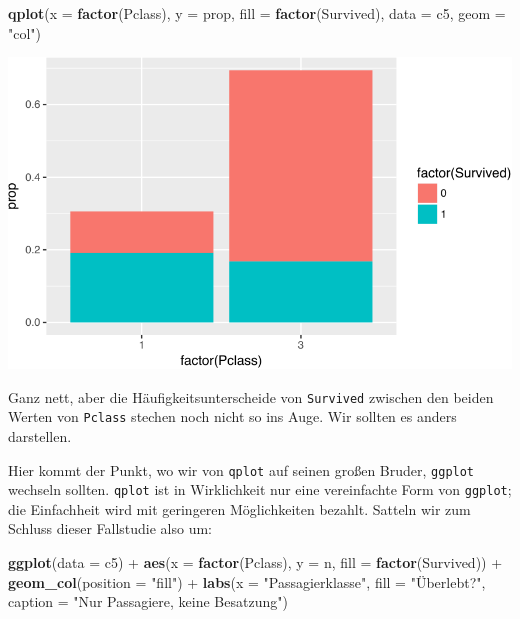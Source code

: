 \documentclass[12pt,]{book}
\newenvironment{Shaded}{\begin{snugshade}}{\end{snugshade}}
\newcommand{\KeywordTok}[1]{\textcolor[rgb]{0.13,0.29,0.53}{\textbf{{#1}}}}
\newcommand{\DataTypeTok}[1]{\textcolor[rgb]{0.13,0.29,0.53}{{#1}}}
\newcommand{\StringTok}[1]{\textcolor[rgb]{0.31,0.60,0.02}{{#1}}}
\newcommand{\NormalTok}[1]{{#1}}
\begin{document}
\begin{Shaded}
\begin{Highlighting}[]
\KeywordTok{qplot}\NormalTok{(}\DataTypeTok{x =} \KeywordTok{factor}\NormalTok{(Pclass), }\DataTypeTok{y =} \NormalTok{prop, }\DataTypeTok{fill =} \KeywordTok{factor}\NormalTok{(Survived), }\DataTypeTok{data =} \NormalTok{c5, }\DataTypeTok{geom =} \StringTok{"col"}\NormalTok{)}
\end{Highlighting}
\end{Shaded}

\begin{center}\includegraphics[width=0.7\linewidth]{075_Fallstudie_Titanic_files/figure-latex/unnamed-chunk-12-1} \end{center}

Ganz nett, aber die Häufigkeitsunterscheide von \texttt{Survived}
zwischen den beiden Werten von \texttt{Pclass} stechen noch nicht so ins
Auge. Wir sollten es anders darstellen.

Hier kommt der Punkt, wo wir von \texttt{qplot} auf seinen großen
Bruder, \texttt{ggplot} wechseln sollten. \texttt{qplot} ist in
Wirklichkeit nur eine vereinfachte Form von \texttt{ggplot}; die
Einfachheit wird mit geringeren Möglichkeiten bezahlt. Satteln wir zum
Schluss dieser Fallstudie also um:

\begin{Shaded}
\begin{Highlighting}[]
\KeywordTok{ggplot}\NormalTok{(}\DataTypeTok{data =} \NormalTok{c5) +}
\StringTok{  }\KeywordTok{aes}\NormalTok{(}\DataTypeTok{x =} \KeywordTok{factor}\NormalTok{(Pclass), }\DataTypeTok{y =} \NormalTok{n, }\DataTypeTok{fill =} \KeywordTok{factor}\NormalTok{(Survived)) +}\StringTok{ }
\StringTok{  }\KeywordTok{geom_col}\NormalTok{(}\DataTypeTok{position =} \StringTok{"fill"}\NormalTok{) +}
\StringTok{  }\KeywordTok{labs}\NormalTok{(}\DataTypeTok{x =} \StringTok{"Passagierklasse"}\NormalTok{, }\DataTypeTok{fill =} \StringTok{"Überlebt?"}\NormalTok{, }\DataTypeTok{caption =} \StringTok{"Nur Passagiere, keine Besatzung"}\NormalTok{)}
\end{Highlighting}
\end{Shaded}
\end{document}
